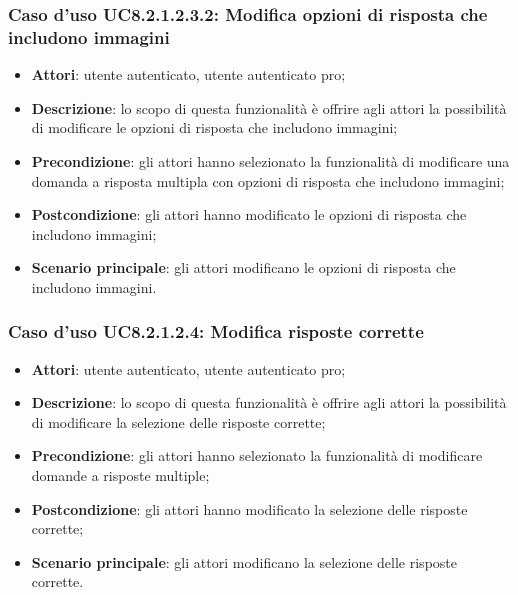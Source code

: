\subsubsection{Caso d'uso UC8.2.1.2.3.2: Modifica opzioni di risposta che includono immagini}
	\begin{itemize}
		\item
			\textbf{Attori}: utente autenticato, utente autenticato pro;
		\item		
			\textbf{Descrizione}: lo scopo di questa funzionalità è offrire agli attori la possibilità di modificare le opzioni di risposta che includono immagini;
		\item
			\textbf{Precondizione}: gli attori hanno selezionato la funzionalità di modificare una domanda a risposta multipla con opzioni di risposta che includono immagini; 
		\item
			\textbf{Postcondizione}: gli attori hanno modificato le opzioni di risposta che includono immagini;
		\item
			\textbf{Scenario principale}: gli attori modificano le opzioni di risposta che includono immagini. 			
	\end{itemize}
	
\subsubsection{Caso d'uso UC8.2.1.2.4: Modifica risposte corrette}
	\begin{itemize}
		\item
			\textbf{Attori}: utente autenticato, utente autenticato pro;
		\item		
			\textbf{Descrizione}: lo scopo di questa funzionalità è offrire agli attori la possibilità di modificare la selezione delle risposte corrette;
		\item
			\textbf{Precondizione}: gli attori hanno selezionato la funzionalità di modificare domande a risposte multiple; 
		\item
			\textbf{Postcondizione}: gli attori hanno modificato la selezione delle risposte corrette;
		\item
			\textbf{Scenario principale}: gli attori modificano la selezione delle risposte corrette. 			
	\end{itemize}

	
	
	
	
	
	
	